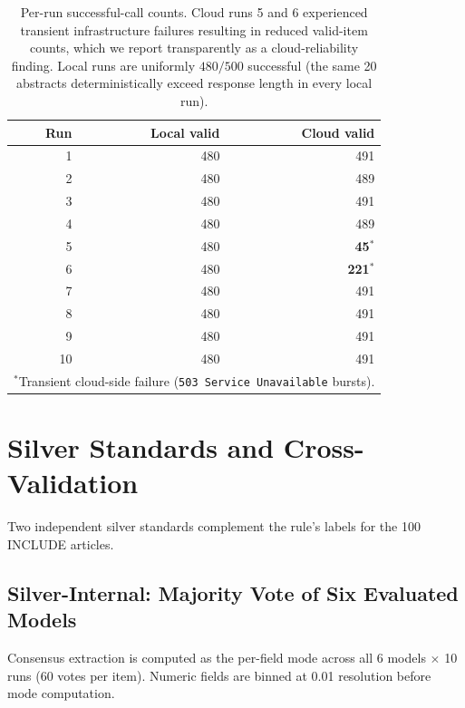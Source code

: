 \documentclass[11pt]{article}
\newenvironment{fittab}{\begin{lrbox}{\fittabbox}}{\end{lrbox}%
  \ifdim\wd\fittabbox>\linewidth\resizebox{\linewidth}{!}{\usebox{\fittabbox}}\else\usebox{\fittabbox}\fi}
\begin{document}
\begin{table}[htbp]
\centering
\caption{Per-run successful-call counts. Cloud runs 5 and 6 experienced transient infrastructure failures resulting in reduced valid-item counts, which we report transparently as a cloud-reliability finding. Local runs are uniformly $480/500$ successful (the same 20 abstracts deterministically exceed response length in every local run).}
\label{tab:desconfound_runs}
\begin{fittab}\begin{tabular}{rrr}
\toprule
\textbf{Run} & \textbf{Local valid} & \textbf{Cloud valid} \\
\midrule
1  & 480 & 491 \\
2  & 480 & 489 \\
3  & 480 & 491 \\
4  & 480 & 489 \\
5  & 480 & \textbf{45}$^{*}$ \\
6  & 480 & \textbf{221}$^{*}$ \\
7  & 480 & 491 \\
8  & 480 & 491 \\
9  & 480 & 491 \\
10 & 480 & 491 \\
\bottomrule
\multicolumn{3}{l}{\footnotesize $^{*}$Transient cloud-side failure (\texttt{503 Service Unavailable} bursts).}
\end{tabular}\end{fittab}
\end{table}

\section{Silver Standards and Cross-Validation}
\label{sec:silvers_supp}

Two independent silver standards complement the rule's labels for the 100 INCLUDE articles.

\subsection{Silver-Internal: Majority Vote of Six Evaluated Models}

Consensus extraction is computed as the per-field mode across all 6 models $\times$ 10 runs (60 votes per item). Numeric fields are binned at 0.01 resolution before mode computation.
\end{document}
